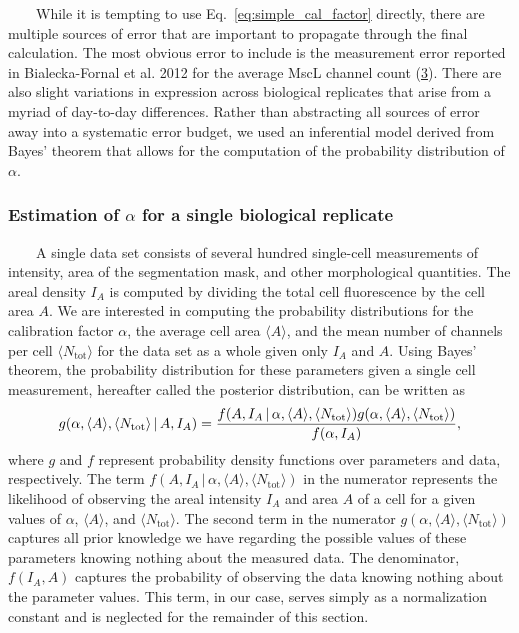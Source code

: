 ~~~~While
it is
tempting
to use
Eq.~\ref{eq:simple_cal_factor}
directly,
there
are
multiple
sources
of
error
that
are
important
to
propagate
through
the
final
calculation.
The
most
obvious
error
to
include
is the
measurement
error
reported
in
Bialecka-Fornal
et al.
2012
for
the
average
MscL
channel
count
(\protect\hyperlink{ref-bialecka-fornal2012}{3}).
There
are
also
slight
variations
in
expression
across
biological
replicates
that
arise
from a
myriad
of
day-to-day
differences.
Rather
than
abstracting
all
sources
of
error
away
into a
systematic
error
budget,
we
used
an
inferential
model
derived
from
Bayes'
theorem
that
allows
for
the
computation
of the
probability
distribution
of
\(\alpha\).

\subsubsection{\texorpdfstring{Estimation
of
\(\alpha\)
for a
single
biological
replicate}{Estimation of \textbackslash{}alpha for a single biological replicate}}\label{estimation-of-alpha-for-a-single-biological-replicate}

~~~~A
single
data
set
consists
of
several
hundred
single-cell
measurements
of
intensity,
area
of the
segmentation
mask,
and
other
morphological
quantities.
The
areal
density
\(I_A\)
is
computed
by
dividing
the
total
cell
fluorescence
by the
cell
area
\(A\).
We are
interested
in
computing
the
probability
distributions
for
the
calibration
factor
\(\alpha\),
the
average
cell
area
\(\langle A \rangle\),
and
the
mean
number
of
channels
per
cell
\(\langle N_\text{tot} \rangle\)
for
the
data
set as
a
whole
given
only
\(I_A\)
and
\(A\).
Using
Bayes'
theorem,
the
probability
distribution
for
these
parameters
given
a
single
cell
measurement,
hereafter
called
the
posterior
distribution,
can be
written
as
\begin{equation}
g(\alpha, \langle A \rangle, \langle N_\text{tot} \rangle\,\vert\, A, I_A) = {f(A, I_A\,\vert
\, \alpha,\langle A \rangle, \langle N_\text{tot} \rangle) g(\alpha,\langle A \rangle, \langle N_\text{tot} \rangle) \over f(\alpha, I_A)},
\label{eq:simple_bayes}\end{equation}
where
\(g\)
and
\(f\)
represent
probability
density
functions
over
parameters
and
data,
respectively.
The
term
\(f(A, I_A\,\vert\, \alpha, \langle A \rangle, \langle N_\text{tot} \rangle)\)
in the
numerator
represents
the
likelihood
of
observing
the
areal
intensity
\(I_A\)
and
area
\(A\)
of a
cell
for a
given
values
of
\(\alpha\),
\(\langle A \rangle\),
and
\(\langle N_\text{tot} \rangle\).
The
second
term
in the
numerator
\(g(\alpha,\langle A \rangle, \langle N_\text{tot} \rangle)\)
captures
all
prior
knowledge
we
have
regarding
the
possible
values
of
these
parameters
knowing
nothing
about
the
measured
data.
The
denominator,
\(f(I_A, A)\)
captures
the
probability
of
observing
the
data
knowing
nothing
about
the
parameter
values.
This
term,
in our
case,
serves
simply
as a
normalization
constant
and is
neglected
for
the
remainder
of
this
section.


